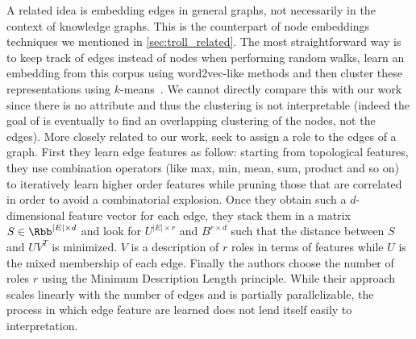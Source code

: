 A related idea is embedding edges in general graphs, not necessarily in the context of knowledge
graphs. This is the counterpart of node embeddings techniques we mentioned in
\autoref{sec:troll_related}. The most straightforward way is to keep track of edges instead of nodes
when performing random walks, learn an embedding from this corpus using word2vec-like methods and
then cluster these representations using $k$-means~\autocite{edgerep17}. We cannot directly compare
this with our work since there is no attribute and thus the clustering is not interpretable (indeed
the goal of \autocite{edgerep17} is eventually to find an overlapping clustering of the nodes, not
the edges). More closely related to our work, \textcite{ahmed2017roles} seek to assign a role to the
edges of a graph. First they learn edge features as follow: starting from topological features, they
use combination operators (like max, min, mean, sum, product and so on) to iteratively learn higher
order features while pruning those that are correlated in order to avoid a combinatorial explosion.
Once they obtain such a $d$-dimensional feature vector for each edge, they stack them in a matrix $S
\in \Rbb^{|E|\times d}$ and look for $U^{|E| \times r}$ and $B^{r \times d}$ such that the distance
between $S$ and $UV^T$ is minimized. $V$ is a description of $r$ roles in terms of features while
$U$ is the mixed membership of each edge. Finally the authors choose the number of roles $r$ using
the Minimum Description Length principle. While their approach scales linearly with the number of
edges and is partially parallelizable, the process in which edge feature are learned does not lend
itself easily to interpretation.

